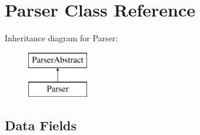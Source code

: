 \section{Parser Class Reference}
\label{class_php_parser_1_1_parser}
Inheritance diagram for Parser\+:\begin{figure}[H]
\begin{center}
\leavevmode
\includegraphics[height=2.000000cm]{class_php_parser_1_1_parser}
\end{center}
\end{figure}
\subsection*{Data Fields}
